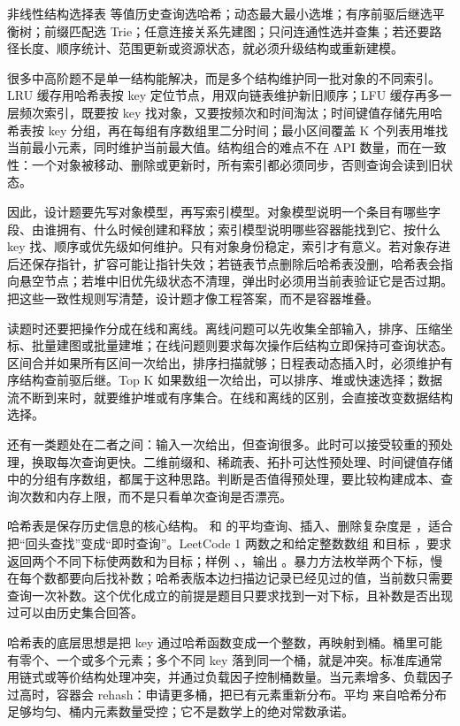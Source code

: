 \begin{principlebox}{非线性结构选择表}
等值历史查询选哈希；动态最大最小选堆；有序前驱后继选平衡树；前缀匹配选 Trie；任意连接关系先建图；只问连通性选并查集；若还要路径长度、顺序统计、范围更新或资源状态，就必须升级结构或重新建模。
\end{principlebox}

很多中高阶题不是单一结构能解决，而是多个结构维护同一批对象的不同索引。LRU 缓存用哈希表按 key 定位节点，用双向链表维护新旧顺序；LFU 缓存再多一层频次索引，既要按 key 找对象，又要按频次和时间淘汰；时间键值存储先用哈希表按 key 分组，再在每组有序数组里二分时间；最小区间覆盖 K 个列表用堆找当前最小元素，同时维护当前最大值。结构组合的难点不在 API 数量，而在一致性：一个对象被移动、删除或更新时，所有索引都必须同步，否则查询会读到旧状态。

因此，设计题要先写对象模型，再写索引模型。对象模型说明一个条目有哪些字段、由谁拥有、什么时候创建和释放；索引模型说明哪些容器能找到它、按什么 key 找、顺序或优先级如何维护。只有对象身份稳定，索引才有意义。若对象存进  后还保存指针，扩容可能让指针失效；若链表节点删除后哈希表没删，哈希表会指向悬空节点；若堆中旧优先级状态不清理，弹出时必须用当前表验证它是否过期。把这些一致性规则写清楚，设计题才像工程答案，而不是容器堆叠。

读题时还要把操作分成在线和离线。离线问题可以先收集全部输入，排序、压缩坐标、批量建图或批量建堆；在线问题则要求每次操作后结构立即保持可查询状态。区间合并如果所有区间一次给出，排序扫描就够；日程表动态插入时，必须维护有序结构查前驱后继。Top K 如果数组一次给出，可以排序、堆或快速选择；数据流不断到来时，就要维护堆或有序集合。在线和离线的区别，会直接改变数据结构选择。

还有一类题处在二者之间：输入一次给出，但查询很多。此时可以接受较重的预处理，换取每次查询更快。二维前缀和、稀疏表、拓扑可达性预处理、时间键值存储中的分组有序数组，都属于这种思路。判断是否值得预处理，要比较构建成本、查询次数和内存上限，而不是只看单次查询是否漂亮。

哈希表是保存历史信息的核心结构。 和  的平均查询、插入、删除复杂度是 ，适合把“回头查找”变成“即时查询”。LeetCode 1 两数之和给定整数数组  和目标 ，要求返回两个不同下标使两数和为目标；样例 、，输出 \code{[0,1]}。暴力方法枚举两个下标，慢在每个数都要向后找补数；哈希表版本边扫描边记录已经见过的值，当前数只需要查询一次补数。这个优化成立的前提是题目只要求找到一对下标，且补数是否出现过可以由历史集合回答。

哈希表的底层思想是把 key 通过哈希函数变成一个整数，再映射到桶。桶里可能有零个、一个或多个元素；多个不同 key 落到同一个桶，就是冲突。标准库通常用链式或等价结构处理冲突，并通过负载因子控制桶数量。当元素增多、负载因子过高时，容器会 rehash：申请更多桶，把已有元素重新分布。平均  来自哈希分布足够均匀、桶内元素数量受控；它不是数学上的绝对常数承诺。

